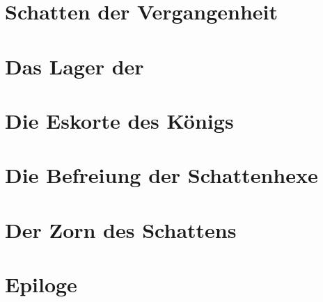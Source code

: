 \newpage
\section{Schatten der Vergangenheit}













\newpage
\section{Das Lager der }










\newpage
\section{Die Eskorte des Königs}









\newpage
\section{Die Befreiung der Schattenhexe}









\newpage
\section{Der Zorn des Schattens}











\newpage
\section{Epiloge}









